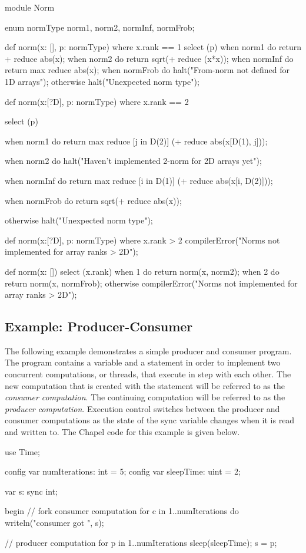 \begin{numberedchapel}
module Norm{
  enum normType {norm1, norm2, normInf, normFrob};

  def norm(x: [], p: normType) where x.rank == 1 {
    select (p) {
      when norm1 do return + reduce abs(x);
      when norm2 do return sqrt(+ reduce (x*x));
      when normInf do return max reduce abs(x);
      when normFrob do halt("From-norm not defined for 1D arrays");
      otherwise halt("Unexpected norm type");
    }
  }

  def norm(x:[?D], p: normType) where x.rank == 2 {
    select (p) {
      when norm1 do
        return max reduce [j in D(2)] (+ reduce abs(x[D(1), j]));

      when norm2 do
        halt("Haven't implemented 2-norm for 2D arrays yet");

      when normInf do
        return max reduce [i in D(1)] (+ reduce abs(x[i, D(2)]));

      when normFrob do return sqrt(+ reduce abs(x));

      otherwise halt("Unexpected norm type");
    }
  }

  def norm(x:[?D], p: normType) where x.rank > 2 {
    compilerError("Norms not implemented for array ranks > 2D");
  }

  def norm(x: []) {
    select (x.rank) {
      when 1 do return norm(x, norm2);
      when 2 do return norm(x, normFrob);
      otherwise compilerError("Norms not implemented for array ranks > 2D");
    }
  }
}
\end{numberedchapel}

\subsection{Example: Producer-Consumer}
The following example demonstrates a simple producer and consumer program.
The program contains a  variable and a  statement 
in order to implement two concurrent computations, or threads, that execute 
in step with each other.
The new computation that is created with the  statement will 
be referred to as the {\em consumer computation}.  The continuing computation
will be referred to as the
{\em producer computation}.  Execution control switches between the
producer and consumer computations as the state of the sync variable  
changes when it is read and written to.  The Chapel code for this example is given below.

\begin{numberedchapel}
use Time;

config var numIterations: int = 5;
config var sleepTime: uint = 2;

var s: sync int;

begin {  // fork consumer computation
  for c in 1..numIterations do
    writeln("consumer got ", s);
}

// producer computation
for p in 1..numIterations {
  sleep(sleepTime);
  s = p;
}
\end{numberedchapel}

